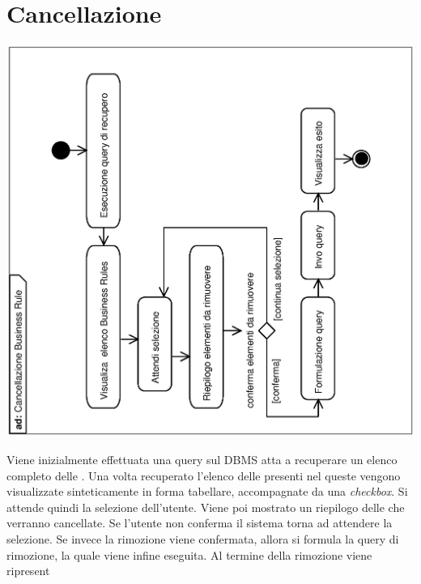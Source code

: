\documentclass[11pt,titlepage,a4paper]{report}
\begin{document}
\section{Cancellazione \br}
\begin{center}
 \includegraphics[width=1\textwidth, angle=-90]{CancellazioneBusinessRule.eps}
\end{center}
Viene inizialmente effettuata una query sul DBMS atta a recuperare un elenco completo delle \brs . Una volta recuperato l'elenco delle \brs presenti nel \re queste vengono visualizzate sinteticamente in forma tabellare, accompagnate da una \textit{checkbox}. Si attende quindi la selezione dell'utente. Viene poi mostrato un riepilogo delle \br che verranno cancellate. Se l'utente non conferma il sistema torna ad attendere la selezione. Se invece la rimozione viene confermata, allora si formula la query di rimozione, la quale viene infine eseguita. Al termine della rimozione viene ripresent


\end{document}
